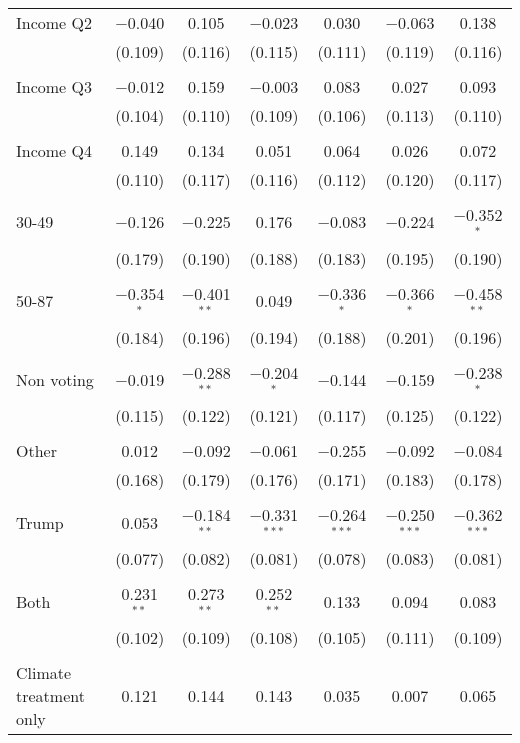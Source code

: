 \begin{tabular}{@{\extracolsep{5pt}}lcccccc}
 Income Q2 & $-$0.040 & 0.105 & $-$0.023 & 0.030 & $-$0.063 & 0.138 \\ 
  & (0.109) & (0.116) & (0.115) & (0.111) & (0.119) & (0.116) \\ 
  & & & & & & \\ 
 Income Q3 & $-$0.012 & 0.159 & $-$0.003 & 0.083 & 0.027 & 0.093 \\ 
  & (0.104) & (0.110) & (0.109) & (0.106) & (0.113) & (0.110) \\ 
  & & & & & & \\ 
 Income Q4 & 0.149 & 0.134 & 0.051 & 0.064 & 0.026 & 0.072 \\ 
  & (0.110) & (0.117) & (0.116) & (0.112) & (0.120) & (0.117) \\ 
  & & & & & & \\ 
 30-49 & $-$0.126 & $-$0.225 & 0.176 & $-$0.083 & $-$0.224 & $-$0.352$^{*}$ \\ 
  & (0.179) & (0.190) & (0.188) & (0.183) & (0.195) & (0.190) \\ 
  & & & & & & \\ 
 50-87 & $-$0.354$^{*}$ & $-$0.401$^{**}$ & 0.049 & $-$0.336$^{*}$ & $-$0.366$^{*}$ & $-$0.458$^{**}$ \\ 
  & (0.184) & (0.196) & (0.194) & (0.188) & (0.201) & (0.196) \\ 
  & & & & & & \\ 
 Non voting & $-$0.019 & $-$0.288$^{**}$ & $-$0.204$^{*}$ & $-$0.144 & $-$0.159 & $-$0.238$^{*}$ \\ 
  & (0.115) & (0.122) & (0.121) & (0.117) & (0.125) & (0.122) \\ 
  & & & & & & \\ 
 Other & 0.012 & $-$0.092 & $-$0.061 & $-$0.255 & $-$0.092 & $-$0.084 \\ 
  & (0.168) & (0.179) & (0.176) & (0.171) & (0.183) & (0.178) \\ 
  & & & & & & \\ 
 Trump & 0.053 & $-$0.184$^{**}$ & $-$0.331$^{***}$ & $-$0.264$^{***}$ & $-$0.250$^{***}$ & $-$0.362$^{***}$ \\ 
  & (0.077) & (0.082) & (0.081) & (0.078) & (0.083) & (0.081) \\ 
  & & & & & & \\ 
 Both & 0.231$^{**}$ & 0.273$^{**}$ & 0.252$^{**}$ & 0.133 & 0.094 & 0.083 \\ 
  & (0.102) & (0.109) & (0.108) & (0.105) & (0.111) & (0.109) \\ 
  & & & & & & \\ 
 Climate treatment only & 0.121 & 0.144 & 0.143 & 0.035 & 0.007 & 0.065 \\ 

\end{tabular}
